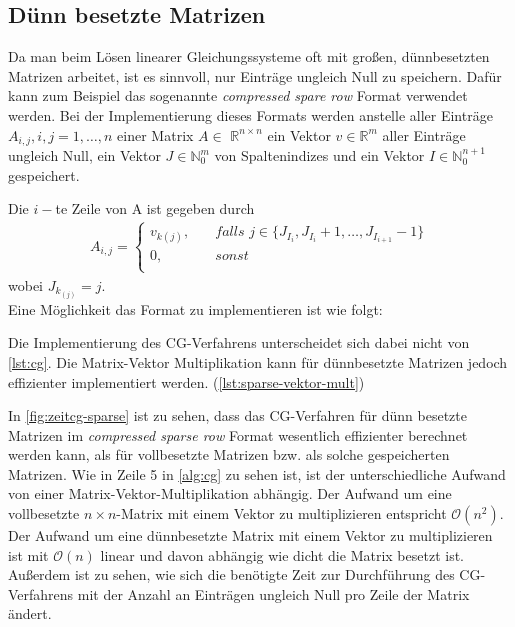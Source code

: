 \documentclass[12pt,a4paper]{scrartcl}
\numberwithin{equation}{section}
\numberwithin{myalgctr}{section}
\numberwithin{mytheoremctr}{subsection}
\numberwithin{mykorollarctr}{subsection}
\numberwithin{mylemmactr}{subsection}
\numberwithin{mybeispielctr}{subsection}
\begin{document}
	
	\subsection{Dünn besetzte Matrizen}
	
	Da man beim Lösen linearer Gleichungssysteme oft mit großen, dünnbesetzten Matrizen arbeitet, ist es sinnvoll, nur Einträge ungleich Null zu speichern. Dafür kann zum Beispiel das sogenannte \textit{compressed spare row} Format verwendet werden. Bei der Implementierung dieses Formats werden anstelle aller Einträge $A_{i,j}, i,j = 1,\ldots,n$ einer Matrix $A\in$ $\mathbb{R}^{n\times n}$ ein Vektor $v\in\mathbb{R}^{m}$ aller Einträge ungleich Null, ein Vektor $J\in\mathbb{N}_0^{m}$ von Spaltenindizes und ein Vektor $I\in\mathbb{N}_0^{n+1}$ gespeichert.
	
	Die $i-$te Zeile von A ist gegeben durch
	\begin{align*}
		A_{i,j} = 
		\begin{cases}
			\textit{$v_{k(j)}$},&\quad\textit{falls $j \in \{J_{I_i}, J_{I_{i}} + 1, \ldots, J_{I_{i+1}} - 1$}\}\\
			\textit{0},&\quad\textit{sonst}\\
		\end{cases}
	\end{align*} 
	wobei $J_{k_{(j)}} = j$.\\
	
	Eine Möglichkeit das Format zu implementieren ist wie folgt:
	
	 
	
	 
	
	
	Die Implementierung des CG-Verfahrens unterscheidet sich dabei nicht von \cref{lst:cg}. Die Matrix-Vektor Multiplikation kann f\"ur d\"unnbesetzte Matrizen jedoch effizienter implementiert werden.  (\cref{lst:sparse-vektor-mult})
	 \label{lst:sparse-vektor-mult}
	
	

	In \cref{fig:zeitcg-sparse} ist zu sehen, dass das CG-Verfahren f\"ur d\"unn besetzte Matrizen im \textit{compressed sparse row} Format wesentlich effizienter berechnet werden kann, als f\"ur vollbesetzte Matrizen bzw. als solche gespeicherten Matrizen.
	Wie in Zeile 5 in \cref{alg:cg} zu sehen ist, ist der unterschiedliche Aufwand von einer Matrix-Vektor-Multiplikation abh\"angig. Der Aufwand um eine vollbesetzte $n\times n$-Matrix mit einem Vektor zu multiplizieren entspricht $\mathcal{O}(n^2)$. Der Aufwand um eine d\"unnbesetzte Matrix mit einem Vektor zu multiplizieren ist mit $\mathcal{O}(n)$ linear und davon abh\"angig wie dicht die Matrix besetzt ist. Außerdem ist zu sehen, wie sich die ben\"otigte Zeit zur Durchf\"uhrung des CG-Verfahrens mit der Anzahl an Eintr\"agen ungleich Null pro Zeile der Matrix \"andert.
	
\end{document}
